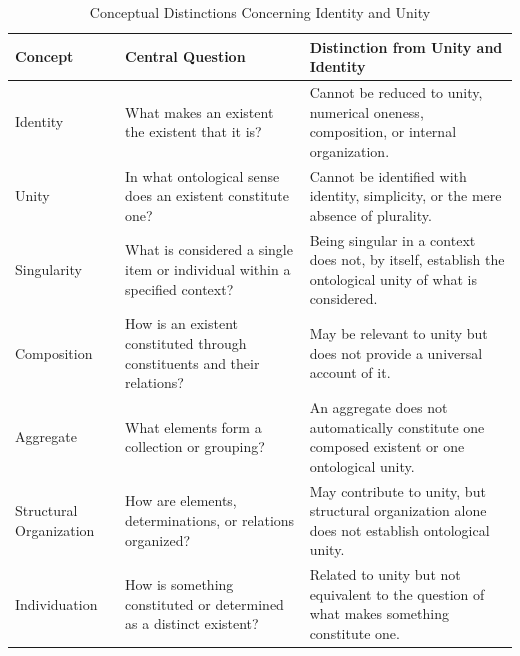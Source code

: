 
\begin{table}[htbp]
\centering
\small
\caption{Conceptual Distinctions Concerning Identity and Unity}
\label{tab:identity-unity-conceptual-distinctions}

\renewcommand{\arraystretch}{1.35}

\begin{tabular}{
|p{}
|p{}
|p{}|
}
\hline
\textbf{Concept}
&
\textbf{Central Question}
&
\textbf{Distinction from Unity and Identity}
\\
\hline

Identity
&
What makes an existent the existent that it is?
&
Cannot be reduced to unity, numerical oneness, composition, or internal organization.
\\
\hline

Unity
&
In what ontological sense does an existent constitute one?
&
Cannot be identified with identity, simplicity, or the mere absence of plurality.
\\
\hline

Singularity
&
What is considered a single item or individual within a specified context?
&
Being singular in a context does not, by itself, establish the ontological unity of what is considered.
\\
\hline

Composition
&
How is an existent constituted through constituents and their relations?
&
May be relevant to unity but does not provide a universal account of it.
\\
\hline

Aggregate
&
What elements form a collection or grouping?
&
An aggregate does not automatically constitute one composed existent or one ontological unity.
\\
\hline

Structural Organization
&
How are elements, determinations, or relations organized?
&
May contribute to unity, but structural organization alone does not establish ontological unity.
\\
\hline

Individuation
&
How is something constituted or determined as a distinct existent?
&
Related to unity but not equivalent to the question of what makes something constitute one.
\\
\hline


\end{tabular}
\end{table}
